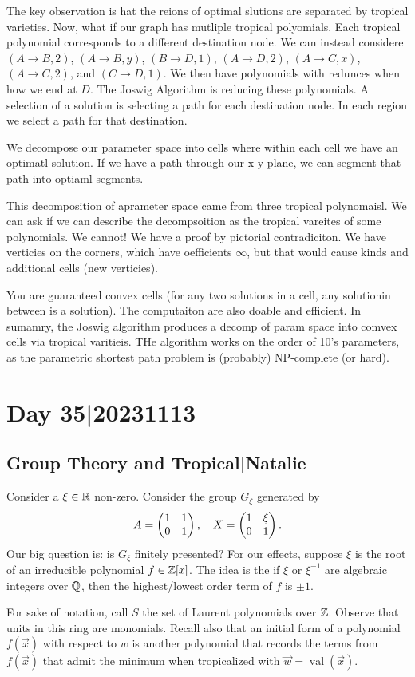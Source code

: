 \documentclass[12pt]{memoir}
\DeclareMathOperator{\val}{val}
\theoremstyle{definition}
\begin{document}
The key observation is hat the reions of optimal slutions are separated by tropical varieties. Now, what if our graph has mutliple tropical polyomials. Each tropical polynomial corresponds to a different destination node. We can instead considere $(A\rightarrow B,2)$, $(A\rightarrow B,y)$, $(B\rightarrow D,1)$, $(A\rightarrow D,2 )$, $(A \rightarrow C, x)$, $(A \rightarrow C,2)$, and $(C \rightarrow D,1)$. We then have polynomials with redunces when how we end at $D$. The Joswig Algorithm is reducing these polynomials. A selection of a solution is selecting a path for each destination node. In each region we select a path for that destination. 

We decompose our parameter space into cells where within each cell we have an optimatl solution. If we have a path through our x-y plane, we can segment that path into optiaml segments.


This decomposition of aprameter space came from three tropical polynomaisl. We can ask if we can describe the decompsoition as the tropical vareites of some polynomials. We cannot! We have a proof by pictorial contradiciton. We have verticies on the corners, which have oefficients $\infty$, but that would cause kinds and additional cells (new verticies).


You are guaranteed convex cells (for any two solutions in a cell, any solutionin between is a solution). The computaiton are also doable and efficient. In sumamry, the Joswig algorithm produces a decomp of param space into comvex cells via tropical varitieis. THe algorithm works on the order of 10's parameters, as the parametric shortest path problem is (probably) NP-complete (or hard).






\section{Day 35|20231113}
\subsection{Group Theory and Tropical|Natalie}

Consider a $\xi\in\mathbb{R}$ non-zero. Consider the group $G_\xi$ generated by 
$$A=\begin{pmatrix} 1 & 1 \\ 0 & 1 \end{pmatrix},\quad X=\begin{pmatrix} 1 & \xi \\ 0 & 1 \end{pmatrix}.$$
Our big question is: is $G_\xi$ finitely presented? For our effects, suppose $\xi$ is the root of an irreducible polynomial $f\in\mathbb{Z}[x]$. The idea is the if $\xi$ or $\xi^{-1}$ are algebraic integers over $\mathbb{Q}$, then the highest/lowest order term of $f$ is $\pm1$.\par 
For sake of notation, call $S$ the set of Laurent polynomials over $\mathbb{Z}$. Observe that units in this ring are monomials. Recall also that an initial form of a polynomial $f(\vec x)$ with respect to $w$ is another polynomial that records the terms from $f(\vec x)$ that admit the minimum when tropicalized with $\vec w=\val(\vec x)$.
\end{document}
